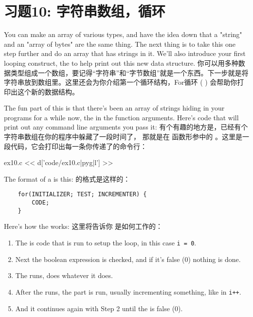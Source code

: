 \chapter{习题10: 字符串数组，循环}

You can make an array of various types, and have the idea down that a
"string" and an "array of bytes" are the same thing.  The next thing is
to take this one step further and do an array that has strings in it.
We'll also introduce your first looping construct, the 
to help print out this new data structure.
你可以用多种数据类型组成一个数组，要记得“字符串”和“字节数组”就是一个东西。下一步就是将字符串放到数组里。这里还会为你介绍第一个循环结构，For循环 (  ) 会帮助你打印出这个新的数据结构。

The fun part of this is that there's been an array of strings hiding in
your programs for a while now, the  in the 
function arguments.  Here's code that will print out any command line
arguments you pass it:
有个有趣的地方是，已经有个字符串数组在你的程序中躲藏了一段时间了， 那就是在  函数形参中的  。这里是一段代码，它会打印出每一条你传递了的命令行：

\begin{code}{ex10.c}
<< d['code/ex10.c|pyg|l'] >>
\end{code}

The format of a  is this:
 的格式是这样的：

\begin{Verbatim}
    for(INITIALIZER; TEST; INCREMENTER) {
        CODE;
    }
\end{Verbatim}

Here's how the  works:
这里将告诉你  是如何工作的：

\begin{enumerate}
\item The  is code that is run to setup the loop, in this
    case \verb|i = 0|.
\item Next the  boolean expression is checked, and if it's false (0)
    nothing is done.
\item The  runs, does whatever it does.
\item After the  runs, the  part is run, usually
    incrementing something, like in \verb|i++|.
\item And it continues again with Step 2 until the  is false (0).
\end{enumerate}

